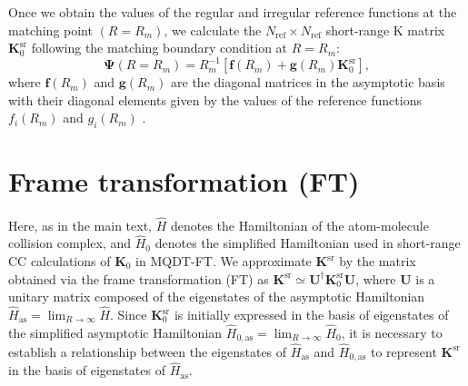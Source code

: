 \documentclass[reprint,amssymb,noeprint,twocolumn,longbibliography]{revtex4-2}
\begin{document}
Once we obtain the values of the regular and irregular reference functions at the matching point $(R=R_m)$, 
we calculate the $N_\mathrm{ref} \times N_\mathrm{ref}$ short-range K matrix $\bm{K}_\mathrm{0}^\text{sr}$ following the matching boundary condition at $R=R_m$:
\begin{equation}
\label{eq:shortBoundary}
\bm{\Psi}(R=R_m)= R_m^{-1}[\bm{f}(R_m)+\bm{g}(R_m)\bm{K}_\mathrm{0}^\text{sr}],
\end{equation}
where $\bm{f}(R_m)$ and $\bm{g}(R_m)$ are the diagonal matrices in the asymptotic basis with their diagonal elements given by the values of the reference functions $f_i(R_m)$ and $g_i(R_m)$ \cite{Croft_13}. 


\section{\label{sec:SM_SR} Frame transformation (FT)}

{
Here, as in the main text, $\hat{H}$ denotes the Hamiltonian of the atom-molecule collision complex, and $\hat{H}_0$ denotes the simplified Hamiltonian used in short-range CC calculations of $\bm{K}_\mathrm{0}$ in MQDT-FT. 
We approximate $\bm{K}^\text{sr}$ by the matrix obtained via the frame transformation (FT) as $\bm{K}^\text{sr} \simeq \bm{U}^{\dagger}\bm{K}_\mathrm{0}^{\text{sr}}\bm{U}$, where %
$\bm{U}$ is a unitary matrix composed of the eigenstates of the asymptotic Hamiltonian $\hat{H}_\text{as}=\lim_{R\to \infty} \hat{H}$.
Since $\bm{K}_\mathrm{0}^{\text{sr}}$ is initially expressed in the basis of eigenstates of the simplified asymptotic Hamiltonian $\hat{H}_{0,\text{as}} = \lim_{R\to \infty}\hat{H}_\mathrm{0}$, it is necessary to establish a relationship between the eigenstates of $\hat{H}_\text{as}$ and $\hat{H}_{0,\text{as}}$ to represent $\bm{K}^\text{sr}$ in the basis of eigenstates of  $\hat{H}_\text{as}$.
}
\end{document}
